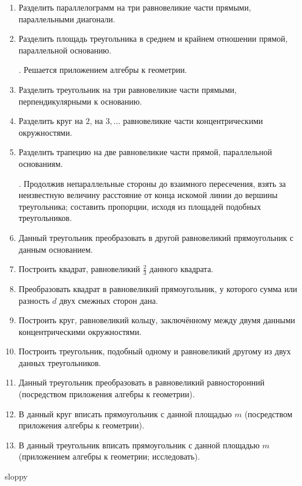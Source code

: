 \documentclass[twoside]{book}
\begin{document}
\begin{enumerate}[resume]


 \item
Разделить параллелограмм на три равновеликие части прямыми, параллельными диагонали.

 \item
Разделить площадь треугольника в среднем и крайнем отношении прямой, параллельной основанию.

\smallskip
{}.
Решается приложением алгебры к геометрии.

 \item
Разделить треугольник на три равновеликие части прямыми, перпендикулярными к основанию.

 \item
Разделить круг на $2$, на $3,\dots$ равновеликие части концентрическими окружностями.

 \item
Разделить трапецию на две равновеликие части прямой, параллельной основаниям.

\smallskip
{}.
Продолжив непараллельные стороны до взаимного пересечения, взять за неизвестную величину расстояние от конца искомой линии до вершины треугольника;
составить пропорции, исходя из площадей подобных треугольников.

 \item
Данный треугольник преобразовать в другой равновеликий прямоугольник с данным основанием.

 \item
Построить квадрат, равновеликий $\tfrac23$ данного квадрата.

 \item
Преобразовать квадрат в равновеликий прямоугольник, у которого сумма или разность $d$ двух смежных сторон дана.

 \item
Построить круг, равновеликий кольцу, заключённому между двумя данными концентрическими окружностями.

 \item
Построить треугольник, подобный одному и равновеликий другому из двух данных треугольников.

 \item
Данный треугольник преобразовать в равновеликий равносторонний (посредством приложения алгебры к геометрии).

 \item
В данный круг вписать прямоугольник с данной площадью $m$ (посредством приложения алгебры к геометрии).

 \item
В данный треугольник вписать прямоугольник с данной площадью $m$ (приложением алгебры к геометрии; исследовать).

\end{enumerate}

{\scriptsize
\printindex
}

{sloppy

\tableofcontents

}

\end{document}

